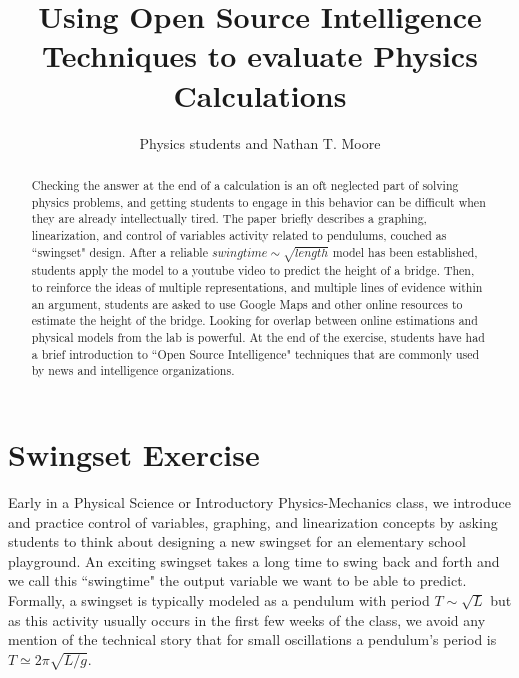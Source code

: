 \documentclass[12pt]{iopart}
\begin{document}
\title[Using Open Source Intelligence Techniques to evaluate Physics Calculations]{Using Open Source Intelligence Techniques to evaluate Physics Calculations}

\author{Physics students and Nathan T. Moore}

\address{
	Physics and General Engineering, 
	Winona State University,
	Winona, MN 55987 USA
}
\vspace{10pt}
\begin{indented}
\item[\today]
\end{indented}

\begin{abstract}
Checking the answer at the end of a calculation is an oft neglected part of solving physics problems, 
and getting students to engage in this behavior can be difficult when they are already intellectually tired. 
The paper briefly describes a graphing, linearization, and control of variables activity related to pendulums, 
couched as ``swingset" design. 
After a reliable $swingtime \sim \sqrt{length}$ model has been established, students apply the model 
to a youtube video to predict the height of a bridge. 
Then, to reinforce the ideas of multiple representations, and multiple lines of evidence within an argument, 
students are asked to use Google Maps and other online resources to estimate the height of the bridge. 
Looking for overlap between online estimations and physical models from the lab is powerful. 
At the end of the exercise, students have had a brief introduction to ``Open Source Intelligence" 
techniques that are commonly used by news and intelligence organizations. 
\end{abstract}



\section{Swingset Exercise}
Early in a Physical Science or Introductory Physics-Mechanics class, we introduce and practice control of variables, 
graphing, and linearization concepts by asking students to think about designing a new swingset for an 
elementary school playground.  
An exciting swingset takes a long time to swing back and forth and we call this ``swingtime" the output variable 
we want to be able to predict.
Formally, a swingset is typically modeled as a pendulum with period 
$T \sim \sqrt{L}$ 
\cite{openstax_pendulum, pivot_pendulum} 
but as this activity usually occurs in the first few weeks of the class, 
we avoid any mention of the technical story that for small oscillations a pendulum's period is 
$T\simeq 2\pi \sqrt{L/g}$.
\end{document}
